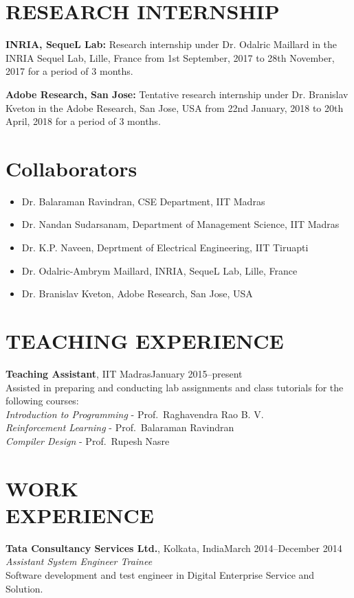 \documentclass[margin,11pt]{res}
\begin{document}
\begin{resume}

\section{RESEARCH INTERNSHIP}
\textbf{INRIA, SequeL Lab:} Research internship under Dr. Odalric Maillard in the INRIA Sequel Lab, Lille, France from 1st September, 2017 to 28th November, 2017 for a period of 3 months.

\textbf{Adobe Research, San Jose:} Tentative research internship under Dr. Branislav Kveton in the Adobe Research, San Jose, USA from 22nd January, 2018 to 20th April, 2018 for a period of 3 months.

\section{Collaborators}
\begin{itemize}
\item Dr. Balaraman Ravindran, CSE Department, IIT Madras
\item Dr. Nandan Sudarsanam, Department of Management Science, IIT Madras
\item Dr. K.P. Naveen, Deprtment of Electrical Engineering, IIT Tiruapti
\item Dr. Odalric-Ambrym Maillard, INRIA, SequeL Lab, Lille, France
\item Dr. Branislav Kveton, Adobe Research, San Jose, USA
\end{itemize}

\section{TEACHING EXPERIENCE}
\par
\textbf{Teaching Assistant}, IIT Madras\hfill January 2015--present\\
Assisted in preparing and conducting lab assignments and class tutorials for the following courses:\\
\textit{Introduction to Programming} - Prof.~Raghavendra Rao B. V. \\
\textit{Reinforcement Learning} - Prof.~Balaraman Ravindran\\
\textit{Compiler Design} - Prof.~Rupesh Nasre

\section{WORK\\EXPERIENCE}
\textbf{Tata Consultancy Services Ltd.}, Kolkata, India\hfill March 2014--December 2014\\
\textit{Assistant System Engineer Trainee}\\
Software development and test engineer in Digital Enterprise Service and Solution.


\end{resume}
\end{document}
